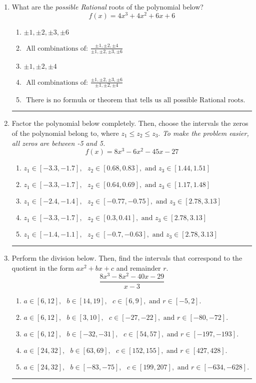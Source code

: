 \documentclass[14pt]{extbook}
\newcommand{\litem}[1]{\item#1\hspace*{-1cm}\rule{\textwidth}{0.4pt}}
\begin{document}
\begin{enumerate}
{\begin{enumerate}[label=\Alph*.]
\end{enumerate} }
\litem{
What are the \textit{possible Rational} roots of the polynomial below?\[ f(x) = 4x^{3} +4 x^{2} +6 x + 6 \]\begin{enumerate}[label=\Alph*.]
\item \( \pm 1,\pm 2,\pm 3,\pm 6 \)
\item \( \text{ All combinations of: }\frac{\pm 1,\pm 2,\pm 4}{\pm 1,\pm 2,\pm 3,\pm 6} \)
\item \( \pm 1,\pm 2,\pm 4 \)
\item \( \text{ All combinations of: }\frac{\pm 1,\pm 2,\pm 3,\pm 6}{\pm 1,\pm 2,\pm 4} \)
\item \( \text{ There is no formula or theorem that tells us all possible Rational roots.} \)

\end{enumerate} }
\litem{
Factor the polynomial below completely. Then, choose the intervals the zeros of the polynomial belong to, where $z_1 \leq z_2 \leq z_3$. \textit{To make the problem easier, all zeros are between -5 and 5.}\[ f(x) = 8x^{3} -6 x^{2} -45 x -27 \]\begin{enumerate}[label=\Alph*.]
\item \( z_1 \in [-3.3, -1.7], \text{   }  z_2 \in [0.68, 0.83], \text{   and   } z_3 \in [1.44, 1.51] \)
\item \( z_1 \in [-3.3, -1.7], \text{   }  z_2 \in [0.64, 0.69], \text{   and   } z_3 \in [1.17, 1.48] \)
\item \( z_1 \in [-2.4, -1.4], \text{   }  z_2 \in [-0.77, -0.75], \text{   and   } z_3 \in [2.78, 3.13] \)
\item \( z_1 \in [-3.3, -1.7], \text{   }  z_2 \in [0.3, 0.41], \text{   and   } z_3 \in [2.78, 3.13] \)
\item \( z_1 \in [-1.4, -1.1], \text{   }  z_2 \in [-0.7, -0.63], \text{   and   } z_3 \in [2.78, 3.13] \)

\end{enumerate} }
\litem{
Perform the division below. Then, find the intervals that correspond to the quotient in the form $ax^2+bx+c$ and remainder $r$.\[ \frac{8x^{3} -8 x^{2} -40 x -29}{x -3} \]\begin{enumerate}[label=\Alph*.]
\item \( a \in [6, 12], \text{   } b \in [14, 19], \text{   } c \in [6, 9], \text{   and   } r \in [-5, 2]. \)
\item \( a \in [6, 12], \text{   } b \in [3, 10], \text{   } c \in [-27, -22], \text{   and   } r \in [-80, -72]. \)
\item \( a \in [6, 12], \text{   } b \in [-32, -31], \text{   } c \in [54, 57], \text{   and   } r \in [-197, -193]. \)
\item \( a \in [24, 32], \text{   } b \in [63, 69], \text{   } c \in [152, 155], \text{   and   } r \in [427, 428]. \)
\item \( a \in [24, 32], \text{   } b \in [-83, -75], \text{   } c \in [199, 207], \text{   and   } r \in [-634, -628]. \)


\end{enumerate}}
\end{enumerate}
\end{document}
